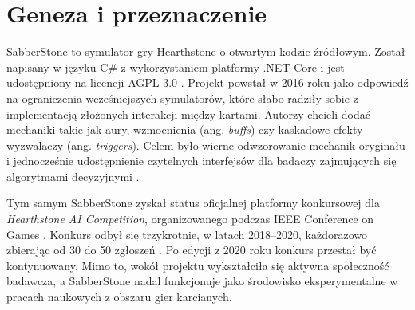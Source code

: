 \section{Geneza i przeznaczenie}

SabberStone to symulator gry Hearthstone o otwartym kodzie źródłowym. Został napisany w języku C\# z wykorzystaniem platformy .NET Core i jest udostępniony na licencji AGPL-3.0 \cite{sabberstone_github}. Projekt powstał w 2016 roku jako odpowiedź na ograniczenia wcześniejszych symulatorów, które słabo radziły sobie z implementacją złożonych interakcji między kartami. Autorzy chcieli dodać mechaniki takie jak aury, wzmocnienia (ang. \textit{buffs}) czy kaskadowe efekty wyzwalaczy (ang. \textit{triggers}). Celem było wierne odwzorowanie mechanik oryginału i jednocześnie udostępnienie czytelnych interfejsów dla badaczy zajmujących się algorytmami decyzyjnymi \cite{sabberstone_hearthsim}.

Tym samym SabberStone zyskał status oficjalnej platformy konkursowej dla \textit{Hearthstone AI Competition}, organizowanego podczas IEEE Conference on Games \cite{ieee_cog, hearthstone_competition}. Konkurs odbył się trzykrotnie, w latach 2018–2020, każdorazowo zbierając od 30 do 50 zgłoszeń \cite{kowalski2023}. Po edycji z 2020 roku konkurs przestał być kontynuowany. Mimo to, wokół projektu wykształciła się aktywna społeczność badawcza, a SabberStone nadal funkcjonuje jako środowisko eksperymentalne w pracach naukowych z obszaru gier karcianych.
